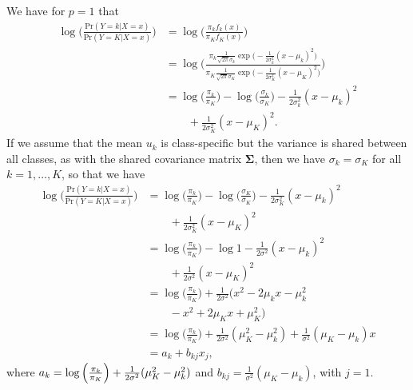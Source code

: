 We have for $p = 1$ that
\begin{equation*}
    \begin{split}
        \log{\biggl(\frac{\text{Pr}(Y = k \vert X = x)}{\text{Pr}(Y = K \vert X = x)}\biggr)}
        &= \log{\biggl(\frac{\pi_k f_k(x)}{\pi_K f_K(x)}\biggr)} \\
        &= \log{\Biggl(\frac{
            \pi_k \frac{1}{\sqrt{2\pi}\sigma_k} \exp{\bigl(-\frac{1}{2\sigma_k^2} {(x - \mu_k)}^2\bigr)}
        }{
            \pi_K \frac{1}{\sqrt{2\pi}\sigma_K} \exp{\bigl(-\frac{1}{2\sigma_K^2} {(x - \mu_K)}^2\bigr)}
        }\Biggr)} \\
        &= \log{\biggl(\frac{\pi_k}{\pi_K}\biggr)} - \log{\biggl(\frac{\sigma_k}{\sigma_K}\biggr)}
            - \frac{1}{2\sigma_k^2} {(x - \mu_k)}^2 \\
        &\qquad + \frac{1}{2\sigma_K^2} {(x - \mu_K)}^2.
    \end{split}
\end{equation*}
If we assume that the mean $u_k$ is class-specific but the variance is shared between 
all classes, as with the shared covariance matrix $\mathbf{\Sigma}$, then we have
$\sigma_k = \sigma_K$ for all $k = 1, \ldots, K$, so that we have
\begin{equation*}
    \begin{split}
        \log{\biggl(\frac{\text{Pr}(Y = k \vert X = x)}{\text{Pr}(Y = K \vert X = x)}\biggr)}
        &= \log{\biggl(\frac{\pi_k}{\pi_K}\biggr)} - \log{\biggl(\frac{\sigma_K}{\sigma_K}\biggr)}
            - \frac{1}{2\sigma_K^2} {(x - \mu_k)}^2 \\
        &\qquad + \frac{1}{2\sigma_K^2} {(x - \mu_K)}^2 \\
        &= \log{\biggl(\frac{\pi_k}{\pi_K}\biggr)} - \log{1} - \frac{1}{2\sigma^2} {(x - \mu_k)}^2 \\
        &\qquad + \frac{1}{2\sigma^2} {(x - \mu_K)}^2 \\
        &= \log{\biggl(\frac{\pi_k}{\pi_K}\biggr)} + \frac{1}{2\sigma^2} (x^2 - 2\mu_k x - \mu_k^2 \\
        &\qquad - x^2 + 2\mu_K x + \mu_K^2) \\
        &= \log{\biggl(\frac{\pi_k}{\pi_K}\biggr)} + \frac{1}{2\sigma^2} (\mu_K^2 - \mu_k^2)
        + \frac{1}{\sigma^2} (\mu_K - \mu_k) x \\
        &= a_k + b_{kj}x_j,
    \end{split}
\end{equation*}
where $a_k = \log{\Bigl(\frac{\pi_k}{\pi_K}\Bigr)} + \frac{1}{2\sigma^2} (\mu_K^2 - \mu_k^2)$ and
$b_{kj} = \frac{1}{\sigma^2} (\mu_K - \mu_k)$, with $j = 1$.

